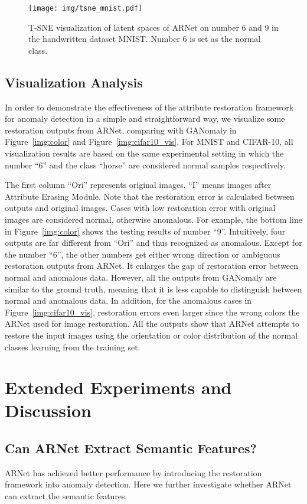 \documentclass[journal]{IEEEtran}
\begin{document}
\begin{figure}[tbp]
\centering
\texttt{[image: img/tsne\_mnist.pdf]}
\caption{T-SNE visualization of latent spaces of ARNet on number 6 and 9 in the handwritten dataset MNIST. Number 6 is set as the normal class.}
\label{img:tsne_mnist}
\end{figure}

\subsection{Visualization Analysis}
In order to demonstrate the effectiveness of the attribute restoration framework for anomaly detection in a simple and straightforward way, we visualize some restoration outputs from ARNet, comparing with GANomaly in Figure~\ref{img:color} and Figure~\ref{img:cifar10_vis}. 
For MNIST and CIFAR-10, all visualization results are based on the same experimental setting in which the number ``6'' and the class ``horse'' are considered normal samples respectively.


The first column ``Ori'' represents original images. ``I'' means images after Attribute Erasing Module. Note that the restoration error is calculated between outputs and original images. Cases with low restoration error with original images are considered normal, otherwise anomalous. For example, the bottom line in Figure~\ref{img:color} shows the testing results of number ``9''. Intuitively, four outputs are far different from ``Ori'' and thus recognized as anomalous. Except for the number ``6'', the other numbers get either wrong direction or ambiguous restoration outputs from ARNet. It enlarges the gap of restoration error between normal and anomalous data. However, all the outputs from GANomaly are similar to the ground truth, meaning that it is less capable to distinguish between normal and anomalous data. In addition, for the anomalous cases in Figure~\ref{img:cifar10_vis}, restoration errors even larger since the wrong colors the ARNet used for image restoration. All the outputs show that ARNet attempts to restore the input images using the orientation or color distribution of the normal classes learning from the training set.

\section{Extended Experiments and Discussion}
\subsection{Can ARNet Extract Semantic Features?}
ARNet has achieved better performance by introducing the restoration framework into anomaly detection. Here we further investigate whether ARNet can extract the semantic features.
\end{document}
